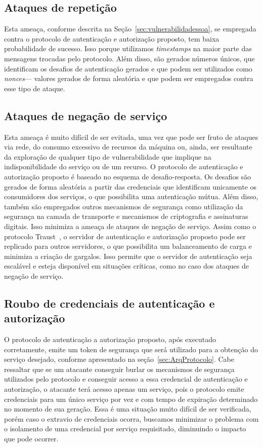 \subsection{Ataques de repetição}

Esta ameaça, conforme descrita na Seção~\ref{sec:vulnerabilidadessoa}, se empregada contra o protocolo de autenticação e autorização proposto, tem baixa probabilidade de sucesso.
 Isso porque utilizamos \emph{timestamps} na maior parte das mensagens trocadas pelo protocolo. Além disso, são gerados números únicos, que identificam os desafios de autenticação gerados e que podem ser utilizados como \emph{nonces}--- valores gerados de forma aleat\'{o}ria e que podem ser empregados contra esse tipo de ataque.

\subsection{Ataques de negação de serviço}

Esta ameaça é muito difícil de ser evitada, uma vez que  pode ser fruto de ataques via rede, do consumo excessivo de recursos da máquina  ou, ainda, ser resultante da exploração de qualquer tipo de vulnerabilidade que implique na indisponibilidade do serviço ou de um recurso. O protocolo de autenticação e autorização proposto é baseado no esquema de desafio-resposta. Os desafios são gerados de forma aleatória a partir das credenciais que identificam unicamente os consumidores dos serviços, o que possibilita uma autenticação mútua. Além disso, também são empregados outros mecanismos de segurança como utilização da segurança na camada de transporte e mecanismos de criptografia e assinaturas digitais. Isso minimiza a ameaça de ataques de negação de serviço. Assim como o protocolo Traust~\cite{traust08}, o servidor de autenticação e autorização proposto pode ser replicado para outros servidores, o que possibilita um balanceamento de carga e minimiza a criação de gargalos. Isso permite que o servidor de autenticação seja escalável e esteja disponível em situações críticas, como no caso dos ataques de negação de serviço.


\subsection{Roubo de credenciais de autenticação e autorização}\label{subsec:RouboCred}

O protocolo de autenticação a autorização proposto, após executado corretamente, emite um token de segurança que será utilizado para a obtenção do serviço desejado, conforme 
apresentado na seção~\ref{sec:ArqProtocolo}. Cabe ressaltar que se um atacante conseguir burlar os mecanismos de segurança utilizados pelo protocolo e conseguir acesso a essa credencial de autenticação e autorização, o atacante terá acesso apenas um serviço, pois o protocolo emite credenciais para um único serviço por vez e com tempo de expiração determinado no momento de sua geração. Essa é uma situação muito difícil de ser verificada, porém caso o extravio de credenciais ocorra, buscamos minimizar o problema com o 
isolamento de uma credencial por servi\c co requisitado, diminuindo o impacto que pode ocorrer. 

